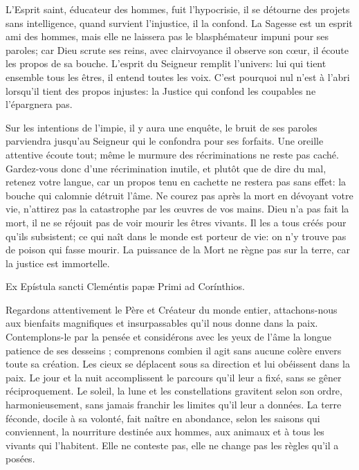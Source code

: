 L’Esprit saint, éducateur des hommes, fuit l’hypocrisie,
	il se détourne des projets sans intelligence,
	quand survient l’injustice, il la confond.
La Sagesse est un esprit ami des hommes,
	mais elle ne laissera pas le blasphémateur impuni pour ses paroles;
	car Dieu scrute ses reins, avec clairvoyance il observe son cœur,
	il écoute les propos de sa bouche.
L’esprit du Seigneur remplit l’univers:
	lui qui tient ensemble tous les êtres, il entend toutes les voix.
C’est pourquoi nul n’est à l’abri lorsqu’il tient des propos injustes:
	la Justice qui confond les coupables ne l’épargnera pas.


Sur les intentions de l’impie, il y aura une enquête,
	le bruit de ses paroles parviendra jusqu’au Seigneur
		qui le confondra pour ses forfaits.
Une oreille attentive écoute tout;
	même le murmure des récriminations ne reste pas caché.
Gardez-vous donc d’une récrimination inutile,
	et plutôt que de dire du mal, retenez votre langue,
	car un propos tenu en cachette ne restera pas sans effet:
	la bouche qui calomnie détruit l’âme.
Ne courez pas après la mort en dévoyant votre vie, 
	n’attirez pas la catastrophe par les œuvres de vos mains.
Dieu n’a pas fait la mort, 
	il ne se réjouit pas de voir mourir les êtres vivants.
Il les a tous créés pour qu’ils subsistent; 
	ce qui naît dans le monde est porteur de vie: 
	on n’y trouve pas de poison qui fasse mourir.
La puissance de la Mort ne règne pas sur la terre,
	car la justice est immortelle.


Ex Epístula sancti Cleméntis papæ Primi ad Corínthios.

Regardons attentivement le Père et Créateur du monde entier, 
	attachons-nous aux bienfaits magnifiques et insurpassables qu'il nous donne dans la paix.
Contemplons-le par la pensée
	et considérons avec les yeux de l'âme la longue patience de ses desseins ;
	comprenons combien il agit sans aucune colère envers toute sa création.
Les cieux se déplacent sous sa direction et lui obéissent dans la paix.
Le jour et la nuit accomplissent le parcours qu'il leur a fixé, sans se gêner réciproquement.
Le soleil, la lune et les constellations gravitent selon son ordre, harmonieusement,
	sans jamais franchir les limites qu'il leur a données.
La terre féconde, docile à sa volonté,
	fait naître en abondance, selon les saisons qui conviennent, la nourriture
		destinée aux hommes, aux animaux et à tous les vivants qui l'habitent.
Elle ne conteste pas, elle ne change pas les règles qu'il a posées.

